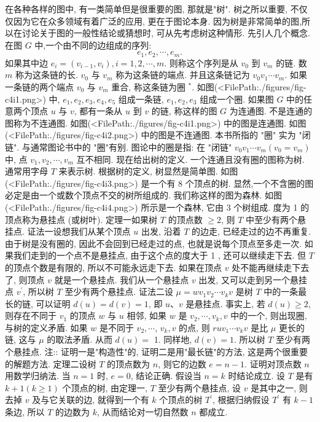 
在各种各样的图中, 有一类简单但是很重要的图, 那就是"树". 树之所以重要, 不仅仅因为它在众多领域有着广泛的应用, 更在于图论本身.
因为树是非常简单的图,所以在讨论关于图的一般性结论或猜想时, 可从先考虑树这种情形.
先引人几个概念.
在图 $G$ 中,一个由不同的边组成的序列:
$$
e_1, e_2, \cdots, e_m .
$$
如果其中边 $e_i=\left(v_{i-1}, v_i\right), i=1,2, \cdots, m$. 则称这个序列是从 $v_0$ 到 $v_m$ 的链.
数 $m$ 称为这条链的长.
$v_0$ 与 $v_m$ 称为这条链的端点.
并且这条链记为 $v_0 v_1 \cdots v_m$.
如果一条链的两个端点 $v_0$ 与 $v_m$ 重合, 称这条链为圈 ${ }^*$.
如图(<FilePath:./figures/fig-c4i1.png>) 中, $e_1, e_2, e_3, e_4, e_5$ 组成一条链, $e_1, e_2, e_3$ 组成一个圈.
如果图 $G$ 中的任意两个顶点 $u$ 与 $v$, 都有一条从 $u$ 到 $v$ 的链, 称这样的图 $G$ 为连通图.
不是连通的图称为不连通图.
如图(<FilePath:./figures/fig-c4i1.png>) 中的图是连通图.
如图(<FilePath:./figures/fig-c4i2.png>) 中的图是不连通图.
本书所指的 "圈" 实为 "闭链". 与通常图论书中的 "圈"有别.
图论中的圈是指: 在 "闭链" $v_0 v_1 \cdots v_m\left(v_0=v_m\right)$ 中, 点 $v_1, v_2, \cdots, v_m$ 互不相同.
现在给出树的定义.
一个连通且没有圈的图称为树.
通常用字母 $T$ 来表示树.
根据树的定义, 树显然是简单图.
如图(<FilePath:./figures/fig-c4i3.png>) 是一个有 8 个顶点的树.
显然,一个不含圈的图必定是由一个或数个顶点不交的树所组成的.
我们称这样的图为森林.
如图(<FilePath:./figures/fig-c4i4.png>) 所示是一个森林, 它由 3 个树组成.
度为 1 的顶点称为悬挂点 (或树叶).
定理一如果树 $T$ 的顶点数 $\geqslant 2$, 则 $T$ 中至少有两个悬挂点.
证法一设想我们从某个顶点 $u$ 出发, 沿着 $T$ 的边走, 已经走过的边不再重复.
由于树是没有圈的, 因此不会回到已经走过的点, 也就是说每个顶点至多走一次.
如果我们走到的一个点不是悬挂点, 由于这个点的度大于 1 , 还可以继续走下去.
但 $T$ 的顶点个数是有限的, 所以不可能永远走下去.
如果在顶点 $v$ 处不能再继续走下去了, 则顶点 $v$ 就是一个悬挂点.
我们从一个悬挂点 $v$ 出发, 又可以走到另一个悬挂点 $v^{\prime}$, 所以树 $T$ 至少有两个悬挂点.
证法二设 $\mu=w v_1 v_2 \cdots v_k v$ 是树 $T$ 中的一条最长的链, 可以证明 $d(u)=d(v)=1$, 即 $u 、 v$ 是悬挂点.
事实上, 若 $d(u) \geqslant 2$, 则存在不同于 $v_1$ 的顶点 $w$ 与 $u$ 相邻, 如果 $w$ 是 $v_2, \cdots, v_k, v$ 中的一个, 则出现圈, 与树的定义矛盾.
如果 $w$ 是不同于 $v_2, \cdots$, $v_k, v$ 的点, 则 $r u v_1 \cdots v_k v$ 是比 $\mu$ 更长的链, 这与 $\mu$ 的取法矛盾.
从而 $d(u)=$ 1. 同样地, $d(v)=1$. 所以树 $T$ 至少有两个悬挂点.
注:: 证明一是"构造性"的, 证明二是用"最长链"的方法, 这是两个很重要的解题方法.
定理二设树 $T$ 的顶点数为 $n$, 则它的边数 $e=n-1$.
证明对顶点数 $n$ 用数学归纳法.
当 $n=1$ 时, $e=0$, 结论正确.
假设当 $n=k$ 时结论成立.
设 $T$ 是有 $k+1(k \geqslant 1)$ 个顶点的树, 由定理一, $T$ 至少有两个悬挂点, 设 $v$ 是其中之一, 则去掉 $v$ 及与它关联的边, 就得到一个有 $k$ 个顶点的树 $T^{\prime}$, 根据归纳假设 $T^{\prime}$ 有 $k-1$ 条边, 所以 $T$ 的边数为 $k$, 从而结论对一切自然数 $n$ 都成立.




